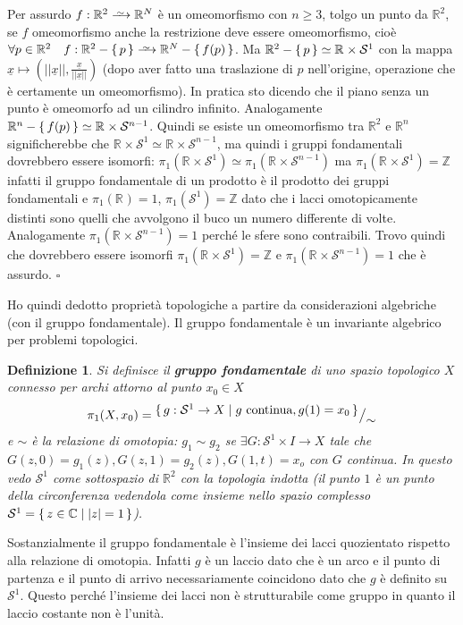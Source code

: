 \documentclass[10pt, twoside=false, x11names]{scrbook}
\newtheorem{definition}[theorem]{Definizione}
\newenvironment{proof}{{\textbf{Dimostrazione}:}}{\hfill $\square$}
\newcommand{\Z}{\mathbb{Z}}
\newcommand{\RN}[1][]{\mathbb{R}^#1}
\newcommand{\Sph}[1][]{\mathcal{S}^#1}
\newcommand{\homoto}{\xrightarrow{\,\smash{\raisebox{-0.65ex}{\ensuremath{\scriptstyle\sim}}}\,}}
\newcommand*\quot[2]{{^{\textstyle #1}\big/_{\textstyle #2}}}
\renewcommand{\vec}[1]{\underline{#1}}
\let\setminus-
\begin{document}
\newmathsymb{homoto}{\homoto}{Omeomorfismo}
\begin{proof}
  Per assurdo $ f : \RN{2} \homoto \RN{N} $ è un omeomorfismo con
  $ n \geq 3 $, tolgo un punto da $ \RN{2} $, se $ f $ omeomorfismo anche la restrizione deve essere omeomorfismo, cioè
  $ \forall p \in \RN{2} \quad f:\RN{2} \setminus \set{p} \homoto \RN{N} \setminus \set{f(p)} $.
  Ma $ \RN{2} \setminus \set{p} \simeq \RN{} \times \mathcal{S}^1 $ con la mappa
  $ \vec{x} \mapsto \left( || \vec{x} ||, \frac{\vec{x}}{|| \vec{x} ||} \right) $ (dopo aver fatto
  una traslazione di $ p $ nell'origine, operazione che è certamente un omeomorfismo). In pratica
  sto dicendo che il piano senza un punto è omeomorfo ad un cilindro infinito.
  Analogamente $ \RN{n} \setminus \set{f(p)} \simeq \RN{} \times \Sph{n-1} $. Quindi se esiste un omeomorfismo tra $ \RN{2} $ e
  $ \RN{n} $ significherebbe che $ \RN{} \times \Sph{1} \simeq \RN{} \times \Sph{n-1} $, ma quindi i gruppi fondamentali
  dovrebbero essere isomorfi:
  $ \pi_1 (\RN{} \times \Sph{1}) \simeq \pi_1(\RN{}\times \Sph{n-1}) $ ma
  $ \pi_1 (\RN{} \times \Sph{1}) = \Z $ infatti il gruppo fondamentale di un prodotto è il prodotto dei gruppi
  fondamentali e $ \pi_1(\RN{}) = 1 $, $ \pi_1(\Sph{1}) = \Z $ dato che i lacci omotopicamente distinti
  sono quelli che avvolgono il buco un numero differente di volte. Analogamente $ \pi_1(\RN{}\times \Sph{n-1}) = 1 $
  perché le sfere sono contraibili. Trovo quindi che dovrebbero essere isomorfi $ \pi_1 (\RN{} \times \Sph{1}) = \Z $
  e $ \pi_1(\RN{}\times \Sph{n-1}) = 1 $ che è assurdo.
\end{proof}

Ho quindi dedotto proprietà topologiche a partire da considerazioni algebriche (con il gruppo fondamentale).
Il gruppo fondamentale è un invariante algebrico per problemi topologici.

\begin{definition}
  Si definisce il \textbf{gruppo fondamentale} di uno spazio topologico $ X $
  connesso per archi attorno al punto $ x_0 \in X $
  \[
    \pi_1 (X, x_0) = \quot{\set{ g: \Sph{1} \to X | g \text{ continua}, g(1) = x_0}}{\sim}
  \]
  e $ \sim $ è la relazione di omotopia: $ g_1 \sim g_2 $ se $ \exists G: \mathcal{S}^1 \times I \to X  $ tale che
  $ G(z,0) = g_1(z), G(z,1) = g_2(z), G(1,t) = x_o $ con $ G $ continua. In questo vedo $ \Sph{1} $ come sottospazio
  di $ \RN{2} $ con la topologia indotta (il punto $ 1 $ è un punto della circonferenza vedendola come
  insieme nello spazio complesso $ \Sph{1} = \set{ z \in \mathbb{C} | |z| = 1} $).
\end{definition}
Sostanzialmente il gruppo fondamentale è l'insieme dei lacci quozientato rispetto alla relazione di omotopia.
Infatti $ g $ è un laccio dato che è un arco e il punto di partenza e il punto di arrivo necessariamente
coincidono dato che $ g $ è definito su $ \Sph{1} $.
Questo perché l'insieme dei lacci non è strutturabile come gruppo in quanto il laccio costante non è
l'unità.
\end{document}
